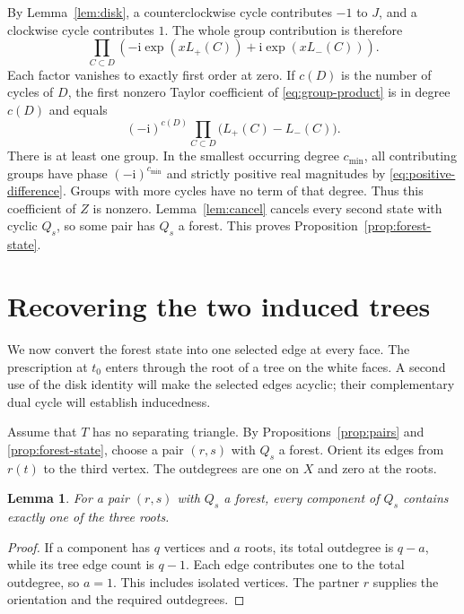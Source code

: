 \documentclass[11pt]{article}
\newtheorem{lemma}[theorem]{Lemma}
\theoremstyle{remark}
\newcommand{\ii}{\mathrm i}
\numberwithin{equation}{section}
\begin{document}


By Lemma~\ref{lem:disk}, a counterclockwise cycle
contributes \(-1\) to \(J\), and a clockwise cycle
contributes \(1\). The whole group contribution is
therefore
\begin{equation}\label{eq:group-product}
 \prod_{C\subset D}
 \left(-\ii\exp(xL_+(C))+\ii\exp(xL_-(C))\right).
\end{equation}
Each factor vanishes to exactly first order at zero.
If \(c(D)\) is the number of cycles of \(D\), the first
nonzero Taylor coefficient of \eqref{eq:group-product}
is in degree \(c(D)\) and equals
\begin{equation}\label{eq:leading-coefficient}
 (-\ii)^{c(D)}
       \prod_{C\subset D}\bigl(L_+(C)-L_-(C)\bigr).
\end{equation}
There is at least one group. In the smallest occurring
degree \(c_{\min}\), all contributing groups have phase
\((-\ii)^{c_{\min}}\) and strictly positive real
magnitudes by \eqref{eq:positive-difference}.
Groups with more cycles have no term of that degree.
Thus this coefficient of \(Z\) is nonzero.
Lemma~\ref{lem:cancel} cancels every second state with
cyclic \(Q_s\), so some pair has \(Q_s\) a forest.
This proves Proposition~\ref{prop:forest-state}.

\section{Recovering the two induced trees}\label{sec:trees}

We now convert the forest state into one selected edge at every face.
The prescription at \(t_0\) enters through the root of a tree on the
white faces. A second use of the disk identity will make the selected
edges acyclic; their complementary dual cycle will establish inducedness.

Assume that \(T\) has no separating triangle.
By Propositions~\ref{prop:pairs} and \ref{prop:forest-state},
choose a pair \((r,s)\) with \(Q_s\) a forest.
Orient its edges from \(r(t)\) to the third vertex.
The outdegrees are one on \(X\) and zero at the roots.
\begin{lemma}\label{lem:root-components}
For a pair \((r,s)\) with \(Q_s\) a forest, every component of
\(Q_s\) contains exactly one of the three roots.
\end{lemma}

\begin{proof}
If a component has \(q\) vertices and \(a\) roots, its total
outdegree is \(q-a\), while its tree edge count is \(q-1\).
Each edge contributes one to the total outdegree, so \(a=1\).
This includes isolated vertices. The partner \(r\) supplies the
orientation and the required outdegrees.
\end{proof}
\end{document}
